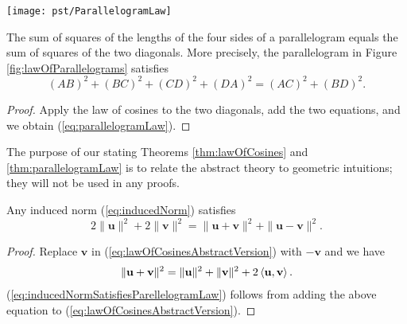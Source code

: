 \begin{Figure}
  \centering
  \texttt{[image: pst/ParallelogramLaw]}
  \label{fig:lawOfParallelograms}
\end{Figure}

\begin{thm}
  \label{thm:parallelogramLaw}
  The sum of squares of the lengths of the four sides
  of a parallelogram equals
  the sum of squares of the two diagonals.
  More precisely,
  the parallelogram in Figure \ref{fig:lawOfParallelograms}
  satisfies 
  \begin{equation}
    \label{eq:parallelogramLaw}
    (AB)^2 + (BC)^2 + (CD)^2 + (DA)^2 = (AC)^2 + (BD)^2.
  \end{equation}
\end{thm}
\begin{proof}
  Apply the law of cosines to the two diagonals,
  add the two equations, and we obtain (\ref{eq:parallelogramLaw}).
\end{proof}

\begin{rem}
  The purpose of our stating
  Theorems \ref{thm:lawOfCosines} and \ref{thm:parallelogramLaw}
  is to relate the abstract theory to geometric intuitions;
  they will not be used in any proofs.
\end{rem}

\begin{thm}
  \label{thm:inducedNormSatisfiesParellelogramLaw}
  Any induced norm (\ref{eq:inducedNorm}) satisfies
  \begin{equation}
    \label{eq:inducedNormSatisfiesParellelogramLaw}
    2\|\mathbf{u}\|^2 + 2\|\mathbf{v}\|^2
    = \|\mathbf{u}+\mathbf{v}\|^2 + \|\mathbf{u}-\mathbf{v}\|^2.
  \end{equation}
\end{thm}
\begin{proof}
  Replace $\mathbf{v}$ in (\ref{eq:lawOfCosinesAbstractVersion})
  with $-\mathbf{v}$ and we have
  \begin{align*}
    \|\mathbf{u} + \mathbf{v}\|^2
    = \|\mathbf{u}\|^2 + \|\mathbf{v}\|^2
    + 2\left\langle \mathbf{u}, \mathbf{v} \right\rangle.
  \end{align*}
  (\ref{eq:inducedNormSatisfiesParellelogramLaw})
  follows from adding the above equation
  to (\ref{eq:lawOfCosinesAbstractVersion}).
\end{proof}

